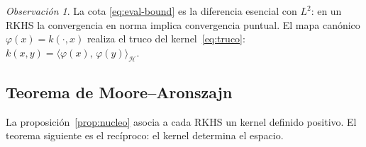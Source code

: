 \documentclass[11pt,a4paper]{article}
\newcommand{\Hk}{\mathcal{H}}
\newcommand{\inner}[2]{\langle #1,\, #2\rangle}
\theoremstyle{plain}
\theoremstyle{definition}
\theoremstyle{remark}
\newtheorem{observacion}[teorema]{Observación}
\numberwithin{equation}{section}
\begin{document}
\begin{observacion}
La cota \eqref{eq:eval-bound} es la diferencia esencial con $L^2$: en un RKHS la
convergencia en norma implica convergencia puntual. El mapa canónico
$\varphi(x)=k(\cdot,x)$ realiza el truco del kernel~\eqref{eq:truco}:
$k(x,y)=\inner{\varphi(x)}{\varphi(y)}_{\Hk}$.
\end{observacion}

\subsection{Teorema de Moore--Aronszajn}

La proposición~\ref{prop:nucleo} asocia a cada RKHS un kernel definido positivo. El teorema
siguiente es el recíproco: el kernel determina el espacio.
\end{document}
